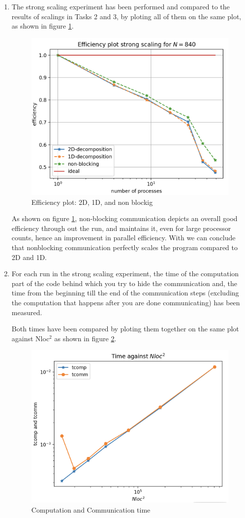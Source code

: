 \documentclass[12pt,a4paper]{article}
\begin{document}
\begin{enumerate}
		\item The strong scaling experiment  has been performed and compared to the results of scalings in Tasks 2 and 3, by ploting all of them on the same plot, as shown in figure \ref{fig:mastery_3}.  
		
		\begin{figure}[H]
			\centering
			\includegraphics[width=0.5\linewidth]{"eff_mastery"}
			\caption{Efficiency plot: 2D, 1D, and non blockig }
			\label{fig:mastery_3}
		\end{figure}
		
		As shown on figure \ref{fig:mastery_3}, non-blocking communication depicts an overall good efficiency through out the run, and maintains it, even for large processor counts, hence an improvement in parallel efficiency. With we can conclude that nonblocking communication perfectly scales the program compared to 2D and 1D.
		
		\item For each run in the strong scaling experiment, the time of the computation part of the code behind which you try to hide the communication and, the time from the beginning till the end of the communication steps (excluding the computation that happens after you are done communicating) has been measured. 
		
		Both times have been compared by ploting them together on the same plot against N\textunderscore loc$^{2}$ as shown in figure \ref{fig:mastery_4}. 
		
			\begin{figure}[H]
			\centering
			\includegraphics[width=0.5\linewidth]{"mastery_4"}
			\caption{Computation and Communication time}
			\label{fig:mastery_4}
		\end{figure}
		

\end{enumerate}
\end{document}
